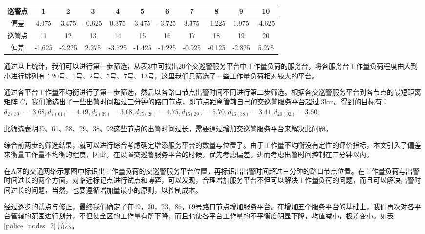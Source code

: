 \documentclass{cumcmthesis}
\begin{document}
    \begin{center}
       \label{police_nodes}
      \begin{tabular}{c|cccccccccc}
        \hline
        巡警点 & 1      & 2      & 3      & 4      & 5      & 6      & 7      & 8      & 9      & 10     \\
        \hline
        偏差   & 4.075  & 3.475  & -0.625 & 0.375  & 3.475  & -3.725 & 3.375  & -1.225 & 1.975  & -4.625 \\
        \hline
        巡警点 & 11     & 12     & 13     & 14     & 15     & 16     & 17     & 18     & 19     & 20     \\
        \hline
        偏差   & -1.625 & -2.225 & 2.275  & -3.725 & -1.425 & -1.225 & -0.925 & -0.125 & -2.825 & 5.275  \\
        \hline
      \end{tabular}
    \end{center}

    通过以上统计，我们可以进行第一步筛选，从表3中可找出20个交巡警服务平台中工作量负荷的服务台，将各服务台工作量负荷程度由大到小进行排列有：20号、1号、2号、5号、7号、13号，这里我们只筛选了一些工作量负荷相对较大的平台。

    通过各平台工作量不均衡进行了第一步筛选，然后以各路口节点出警时间不同进行第二步筛选。根据各交巡警服务平台到各节点的最短距离矩阵 $C$，我们筛选出了一些出警时间超过三分钟的路口节点，即节点距离管辖自己的交巡警服务平台超过 3km。得到的目标有：
    $d_{2(39)} = 3.68, d_{7(61)} = 4.19, d_{2(39)} = 3.68, d_{15(28)} = 4.75, d_{15(29)} = 5.70, d_{16(38)} = 3.41, d_{20(92)} = 3.60$。

    此筛选表明39、61、28、29、38、92这些节点的出警时间过长，需要通过增加交巡警服务平台来解决此问题。

    综合前两步的筛选结果，就可以进行综合考虑确定增添服务平台的数量与位置了。由于工作量不均衡没有定性的评价指标，本文引入了偏差来衡量工作量不均衡的程度，因此，在设置交巡警服务平台的时候，优先考虑偏差，进而考虑出警时间控制在三分钟以内。

    在A区的交通网络示意图中标识出工作量负荷的交巡警服务平台位置，再标识出出警时间超过三分钟的路口节点位置。在工作量负荷与出警时间过长的两个方面，对临近标记点进行试点和博弈，可以发现，合理增加服务平台不但可以解决工作量负荷的问题，而且可以解决出警时间过长的问题，当然，也要遵循增加量最小的原则，以控制成本。

    经过逐步的试点与修正，最终我们确定了在49，30，23，86，69号路口节点增加服务平台。在增加五个服务平台的基础上，我们再次对各平台管辖的范围进行划分，不但使全区的工作量有所下降，而且也使各平台工作量的不平衡度明显下降，均值减小，极差变小。如表 \ref{police_nodes_2} 所示。
\end{document}
